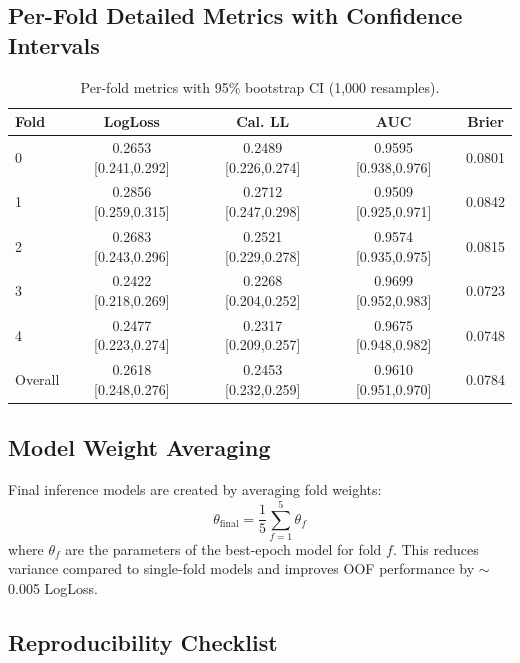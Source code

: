 \subsection{Per-Fold Detailed Metrics with Confidence Intervals}
\label{app:per_fold_detailed}

\begin{table}[H]
\centering
\caption{Per-fold metrics with 95\% bootstrap CI (1,000 resamples).}
\label{tab:fold_detailed}
\begin{tabular}{lcccc}
\toprule
\textbf{Fold} & \textbf{LogLoss} & \textbf{Cal. LL} & \textbf{AUC} & \textbf{Brier} \\
\midrule
0 & 0.2653 [0.241,0.292] & 0.2489 [0.226,0.274] & 0.9595 [0.938,0.976] & 0.0801 \\
1 & 0.2856 [0.259,0.315] & 0.2712 [0.247,0.298] & 0.9509 [0.925,0.971] & 0.0842 \\
2 & 0.2683 [0.243,0.296] & 0.2521 [0.229,0.278] & 0.9574 [0.935,0.975] & 0.0815 \\
3 & 0.2422 [0.218,0.269] & 0.2268 [0.204,0.252] & 0.9699 [0.952,0.983] & 0.0723 \\
4 & 0.2477 [0.223,0.274] & 0.2317 [0.209,0.257] & 0.9675 [0.948,0.982] & 0.0748 \\
\midrule
Overall & 0.2618 [0.248,0.276] & 0.2453 [0.232,0.259] & 0.9610 [0.951,0.970] & 0.0784 \\
\bottomrule
\end{tabular}
\end{table}

\subsection{Model Weight Averaging}
\label{app:weight_avg}

Final inference models are created by averaging fold weights:
\begin{equation}
    \theta_{\text{final}} = \frac{1}{5} \sum_{f=1}^{5} \theta_{f}
\end{equation}
where $\theta_{f}$ are the parameters of the best-epoch model for fold $f$. This reduces variance compared to single-fold models and improves OOF performance by $\sim$0.005 LogLoss.

\subsection{Reproducibility Checklist}
\label{app:reproducibility}

